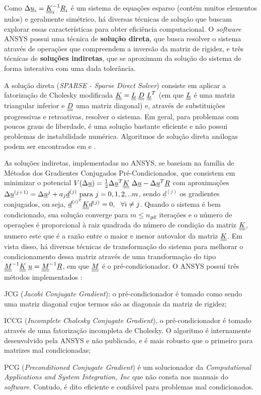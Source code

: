 Como $\Delta \underline u_i = \underline{\underline K}_i^{-1}\underline{R}_i$ é um sistema de equações esparso (contém muitos elementos nulos) e geralmente simétrico, há diversas técnicas de solução que buscam explorar essas características para obter eficiência computacional. O \textit{software} ANSYS possui uma técnica de \textbf{solução direta}, que busca resolver o sistema através de operações que compreendem a inversão da matriz de rigidez, e três técnicas de \textbf{soluções indiretas}, que se aproximam da solução do sistema de forma interativa com uma dada tolerância.

A solução direta (\textit{SPARSE - Sparse Direct Solver}) consiste em aplicar a fatorização de Cholesky modificada $\underline{\underline K} = \underline{\underline L}~\underline{\underline D}~ \underline{\underline L}^T$ (em que $\underline{\underline L}$ é uma matriz triangular inferior e $\underline{\underline D}$ uma matriz diagonal) e, através de substituições progressivas e retroativas, resolver o sistema. Em geral, para problemas com poucos graus de liberdade, é uma solução bastante eficiente e não possui problemas de instabilidade numérica. Algoritmos de solução direta análogas podem ser encontrados em  e .

As soluções indiretas, implementadas no ANSYS, se baseiam na família de Métodos dos Gradientes Conjugados Pré-Condicionados, que consistem em minimizar o potencial $V(\Delta \underline u) = \frac{1}{2}\Delta \underline u^T\underline{\underline K}~\Delta \underline u - \Delta \underline u^T\underline{R}$ com aproximações $\Delta \underline u^{(j+1)}=\Delta \underline u^{j} + a_j \underline{d}^{(j)}~\text{para}~j=0,1,2,..m$, sendo $\underline d^{(j)}$ os gradientes conjugados, ou seja, $\underline {d}^{{(i)}^T} \underline{\underline K} d^{(j)} = 0,~~ \forall i \neq j$. Quando o sistema é bem condicionado, sua solução converge para $m \leq n_{gdl}$ iterações e o número de operações é proporcional à raiz quadrada do número de condição da matriz $\underline{\underline K}$, numero este que é a razão entre o maior e menor autovalor da matriz $\underline{\underline K}$. Em vista disso, há diversas técnicas de transformação do sistema para melhorar o condicionamento dessa matriz através de uma transformação do tipo $\underline{\underline M}^{-1}\underline{\underline K}~\underline u = \underline{\underline M}^{-1} \underline{R}$, em que $\underline{\underline M}$ é o pré-condicionador. O ANSYS possuí três métodos implementados \cite[p. 647]{ANSYS2018}:

\begin{alineas}
	
	\item JCG (\textit{Jacobi Conjugate Gradient}): o pré-condicionador é tomado como sendo uma matriz diagonal cujos termos são as diagonais da matriz de rigidez;
	
	\item ICCG (\textit{Incomplete Cholesky Conjugate Gradient}), o pré-condicionador é tomado através de uma fatorização incompleta de Cholesky. O algoritmo é internamente desenvolvido pela ANSYS e não publicado, e é mais robusto que o primeiro para matrizes mal condicionadas;
	
	\item PCG (\textit{Preconditioned Conjugate Gradient}) é um solucionador da \textit{Computational Applications and System Integration, Inc} que não consta nos manuais do \textit{software}. Contudo, é dito eficiente e confiável para problemas mal condicionados.
	
\end{alineas}


